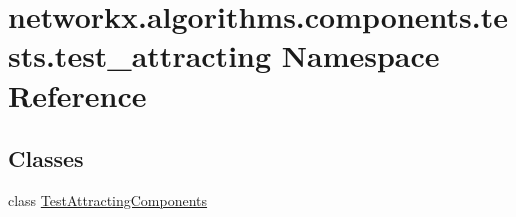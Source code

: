 \hypertarget{namespacenetworkx_1_1algorithms_1_1components_1_1tests_1_1test__attracting}{}\section{networkx.\+algorithms.\+components.\+tests.\+test\+\_\+attracting Namespace Reference}
\label{namespacenetworkx_1_1algorithms_1_1components_1_1tests_1_1test__attracting}
\subsection*{Classes}
\begin{DoxyCompactItemize}
\item 
class \hyperlink{classnetworkx_1_1algorithms_1_1components_1_1tests_1_1test__attracting_1_1TestAttractingComponents}{Test\+Attracting\+Components}
\end{DoxyCompactItemize}
